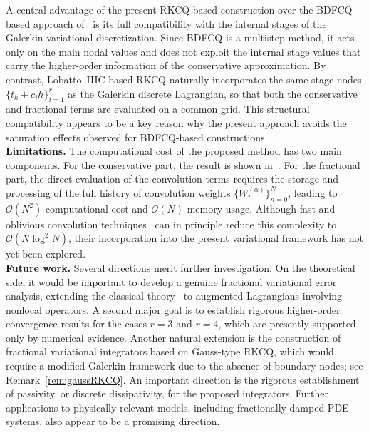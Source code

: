 \documentclass[a4paper,10pt,reqno]{amsart}
\theoremstyle{definition}
\begin{document}
A central advantage of the present RKCQ-based construction over the BDFCQ-based approach of~\cite{HaJiOb} is its full compatibility with the internal stages of the Galerkin variational discretization. Since BDFCQ is a multistep method, it acts only on the main nodal values and does not exploit the internal stage values that carry the higher-order information of the conservative approximation. By contrast, Lobatto~IIIC-based RKCQ naturally incorporates the same stage nodes $\{t_k + c_i h\}_{i=1}^r$
as the Galerkin discrete Lagrangian, so that both the conservative and fractional terms are evaluated on a common grid. This structural compatibility appears to be a key reason why the present approach avoids the saturation effects observed for BDFCQ-based constructions.\\
\noindent\textbf{Limitations.} The computational cost of the proposed method has two main components. For   the conservative part, the result is shown in~\cite{SinaSaake}. For the fractional part, the direct evaluation of the convolution terms requires the storage and processing of the full history of convolution weights $\{W_n^{(\alpha)}\}_{n=0}^{N}$, leading to $\mathcal{O}(N^2)$ computational cost and $\mathcal{O}(N)$ memory usage. Although fast and oblivious convolution techniques~\cite{LuOs} can in principle reduce this complexity to $\mathcal{O}(N \log^2 N)$, their incorporation into the present variational framework has not yet been explored.\\
\noindent\textbf{Future work.} Several directions merit further investigation. On the theoretical side, it would be important to develop a genuine fractional variational error analysis, extending the classical theory~\cite{MaWe} to augmented Lagrangians involving nonlocal operators. 
A second major goal is to establish rigorous higher-order convergence results for the cases 
 $r=3$ and  $r=4$, which are presently supported only by numerical evidence. Another natural extension is the construction of fractional variational integrators based on Gauss-type RKCQ, which would require a modified Galerkin framework due to the absence of boundary nodes; see Remark~\ref{rem:gaussRKCQ}.  An important direction is the rigorous establishment of passivity, or discrete dissipativity, for the proposed integrators. Further applications to physically relevant models, including fractionally damped PDE systems, also appear to be a promising direction.


%


\end{document}
